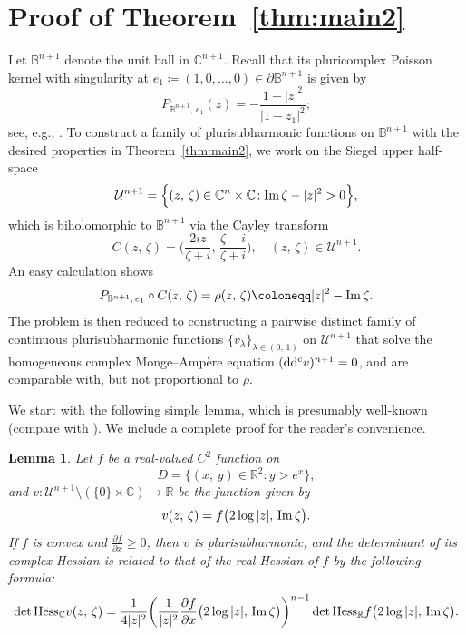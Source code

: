 \documentclass[12pt,a4paper]{amsart}
\numberwithin{equation}{section}
\newtheorem{lemma}[theorem]{Lemma}
\theoremstyle{definition}
\newcommand{\ddc}{{\rm dd^c}}
\begin{document}
\section{Proof of Theorem~\ref{thm:main2}}\label{sect:Pf-MainThm2}
Let $\mathbb B^{n+1}$ denote the unit ball in $\mathbb C^{n+1}$. Recall that its pluricomplex Poisson kernel with singularity at $e_{1}\coloneqq (1, 0,\ldots, 0)\in\partial\mathbb B^{n+1}$ is given by
  $$
  P_{\mathbb B^{n+1},\, e_1}(z)=-\frac{1-|z|^2}{|1-z_1|^2};
  $$
see, e.g., \cite[Section 1 and Theorem 5.1]{Bracci-Trans09}. To construct a family of plurisubharmonic functions on  $\mathbb B^{n+1}$ with the desired properties in Theorem~\ref{thm:main2}, we work on the Siegel upper
half-space
    $$
     \mathcal{U}^{n+1}=\Bigl\{(z,\, \zeta)\in\mathbb C^{n}\times\mathbb C\!: {\rm Im}\, \zeta-|z|^2>0 \Bigr\},
    $$
which is biholomorphic to $\mathbb B^{n+1}$ via the Cayley transform
   $$
   C(z,\, \zeta) =\bigg(\frac{2i z}{\zeta+i},\, \frac{\zeta-i}{\zeta+i}\bigg),     \quad (z,\,\zeta)\in \mathcal{U}^{n+1}.
   $$
An easy calculation shows
    $$
    P_{\mathbb B^{n+1},\, e_1}\circ C(z,\, \zeta)=\rho (z,\, \zeta) \coloneqq |z|^{2}-{\rm Im}\,\zeta.
    $$
The problem is then reduced to constructing a pairwise distinct family of continuous plurisubharmonic functions $\{v_{\lambda}\}_{\lambda\in(0,\, 1)}$
on $\mathcal{U}^{n+1}$ that solve the homogeneous complex Monge--Amp\`ere equation $(\ddc v)^{n+1}=0$, and are comparable with, but  not proportional to $\rho$.

We start with the following simple lemma, which is presumably well-known (compare with \cite[Chapter I]{Demaillybook}). We include a complete proof for the
reader's convenience.

\begin{lemma}\label{lem:convex-psh}
Let $f$ be a real-valued $C^{2}$ function on
   \[
    D=\big\{(x,\, y)\in \mathbb R^{2}\!: y>e^{x}\big\},
   \]
and  $v\!:\mathcal{U}^{n+1} \!\setminus\! (\{0\}\times\mathbb C)\rightarrow \mathbb R$ be the function given by
   \[
    v(z,\, \zeta)=f\big(2\log|z|,\, {\rm Im}\, \zeta \big).
   \]
If $f$ is convex and $\frac{\partial f}{\partial x}\geq 0$, then $v$ is plurisubharmonic, and the determinant of its complex Hessian is
related to that of the real Hessian of $f$ by the following formula:
\begin{equation*}\label{eq:complex-real-hessian}
    \det {\rm Hess}_{\mathbb C} v(z,\, \zeta)
      =\frac{1}{4|z|^2} \bigg(\frac{1}{|z|^2} \frac{\partial f}{\partial x}  \bigl(2\log|z|,\, {\rm Im}\,\zeta\bigr) \bigg)^{n-1}
         \det {\rm Hess}_{\mathbb R} f \bigl(2\log|z|,\, {\rm Im}\,\zeta\bigr).
\end{equation*}
\end{lemma}
\end{document}
